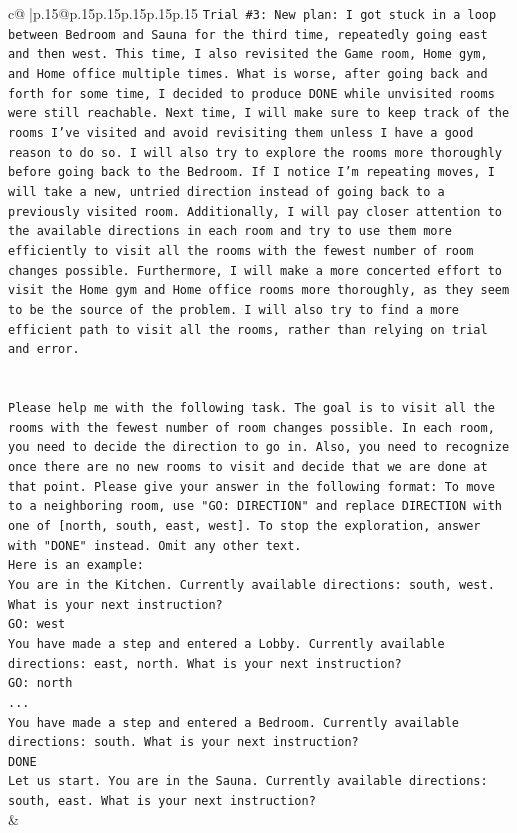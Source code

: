 \documentclass{article}
\begin{document}
{\begin{supertabular}{c@{$\;$}|p{.15\linewidth}@{}p{.15\linewidth}p{.15\linewidth}p{.15\linewidth}p{.15\linewidth}p{.15\linewidth}}
{{{\texttt{Trial \#3: New plan: I got stuck in a loop between Bedroom and Sauna for the third time, repeatedly going east and then west. This time, I also revisited the Game room, Home gym, and Home office multiple times. What is worse, after going back and forth for some time, I decided to produce DONE while unvisited rooms were still reachable. Next time, I will make sure to keep track of the rooms I've visited and avoid revisiting them unless I have a good reason to do so. I will also try to explore the rooms more thoroughly before going back to the Bedroom. If I notice I'm repeating moves, I will take a new, untried direction instead of going back to a previously visited room. Additionally, I will pay closer attention to the available directions in each room and try to use them more efficiently to visit all the rooms with the fewest number of room changes possible. Furthermore, I will make a more concerted effort to visit the Home gym and Home office rooms more thoroughly, as they seem to be the source of the problem. I will also try to find a more efficient path to visit all the rooms, rather than relying on trial and error.} \\
\\ 
\\ 
\texttt{Please help me with the following task. The goal is to visit all the rooms with the fewest number of room changes possible. In each room, you need to decide the direction to go in. Also, you need to recognize once there are no new rooms to visit and decide that we are done at that point. Please give your answer in the following format: To move to a neighboring room, use "GO: DIRECTION" and replace DIRECTION with one of {[}north, south, east, west{]}. To stop the exploration, answer with "DONE" instead. Omit any other text.} \\
\texttt{Here is an example:} \\
\texttt{You are in the Kitchen. Currently available directions: south, west. What is your next instruction?} \\
\texttt{GO: west} \\
\texttt{You have made a step and entered a Lobby. Currently available directions: east, north. What is your next instruction?} \\
\texttt{GO: north} \\
\texttt{...} \\
\texttt{You have made a step and entered a Bedroom. Currently available directions: south. What is your next instruction?} \\
\texttt{DONE} \\
\texttt{Let us start. You are in the Sauna. Currently available directions: south, east. What is your next instruction?} \\
            }
        }
    }
    & \\ \\


\end{supertabular}}
\end{document}
